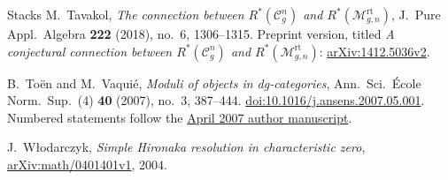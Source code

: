 \begin{thebibliography}{Stacks}
M.~Tavakol,
\emph{The connection between $R^*(\mathcal C_g^n)$ and
$R^*(\mathcal M_{g,n}^{\mathrm{rt}})$},
J.\ Pure Appl.\ Algebra \textbf{222} (2018), no.~6, 1306--1315.
Preprint version, titled \emph{A conjectural connection between
$R^*(\mathcal C_g^n)$ and $R^*(\mathcal M_{g,n}^{\mathrm{rt}})$}:
\href{https://arxiv.org/abs/1412.5036v2}{arXiv:1412.5036v2}.

B.~To\"en and M.~Vaqui\'e,
\emph{Moduli of objects in dg-categories},
Ann.\ Sci.\ \'Ecole Norm.\ Sup.\ (4) \textbf{40} (2007), no.~3, 387--444.
\href{https://doi.org/10.1016/j.ansens.2007.05.001}{doi:10.1016/j.ansens.2007.05.001}.
Numbered statements follow the
\href{https://www.math.univ-toulouse.fr/~btoen/ttt.pdf}{April 2007 author manuscript}.

J.~W{\l}odarczyk,
\emph{Simple Hironaka resolution in characteristic zero},
\href{https://arxiv.org/abs/math/0401401v1}{arXiv:math/0401401v1}, 2004.

\end{thebibliography}
